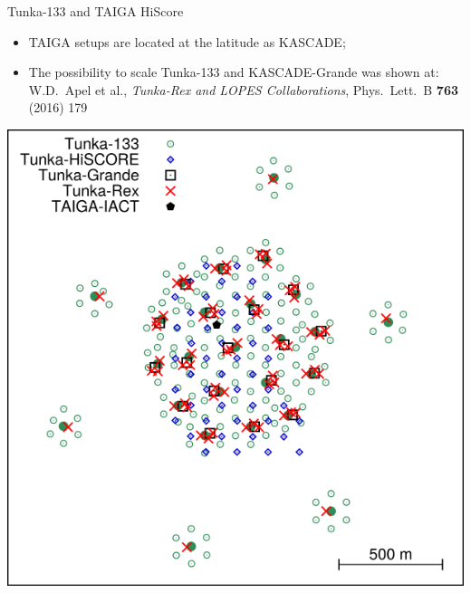 
%

\begin{frame}{Tunka-133 and TAIGA HiScore}
\begin{minipage}[c]{0.49\textwidth}
\begin{itemize}
  \item TAIGA setups are located at the latitude as KASCADE;
  \item The possibility to scale  Tunka-133 and KASCADE-Grande was shown at:
  W.D.~Apel et al., \textit{Tunka-Rex and LOPES Collaborations}, Phys.\ Lett.\ B \textbf{763} (2016) 179
\end{itemize}
\end{minipage}
\hfill
\begin{minipage}[c]{0.49\textwidth}
\includegraphics[width=1\textwidth]{pics/taiga_map.png}
\end{minipage}
\end{frame}


